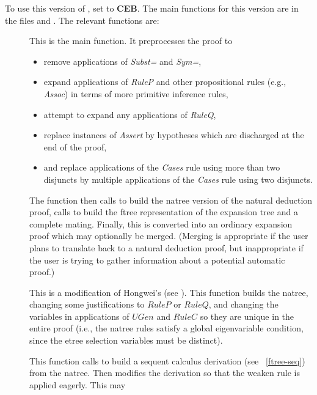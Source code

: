 To use this version of , set
 to {\bf CEB}.
The main functions for this version are in the
files  and .  
The relevant functions are:
\begin{description}
\item []  
This is the main function.  It preprocesses the proof to 
\begin{itemize}
\item remove applications of {\it Subst=} and {\it Sym=},
\item expand applications of {\it RuleP} and other propositional rules
(e.g., {\it Assoc}) in terms of more
primitive inference rules,
\item attempt to expand any applications of {\it RuleQ},
\item replace instances of {\it Assert} by hypotheses
which are discharged at the end of the proof,
\item and replace applications of the {\it Cases} rule
using more than two disjuncts by multiple applications
of the {\it Cases} rule using two disjuncts.
\end{itemize}
The function then calls  to build
the natree version of the natural deduction proof, calls
 to build the ftree representation
of the expansion tree and a complete mating.  Finally, this
is converted into an ordinary expansion proof which may optionally
be merged.  (Merging is appropriate if the user plans to translate
back to a natural deduction proof, but inappropriate if the user
is trying to gather information about a potential automatic proof.)
\item []  This is a modification
of Hongwei's 
 (see ).
This function builds the natree, changing some justifications to $RuleP$
or $RuleQ$, and changing the variables in applications of $UGen$ and $RuleC$
so they are unique in the entire proof (i.e., the natree rules satisfy a global
eigenvariable condition, since the etree selection variables must be distinct).
\item []  This function calls
 to build a sequent calculus derivation
(see ~\ref{ftree-seq}) from the natree.  Then 
modifies the derivation so that the weaken rule is applied eagerly.  This may

\end{description}

